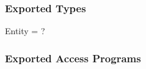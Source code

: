\documentclass[12pt]{article}
\begin{document}


\subsubsection*{Exported Types}

Entity = ?

\subsubsection*{Exported Access Programs}
\end{document}
